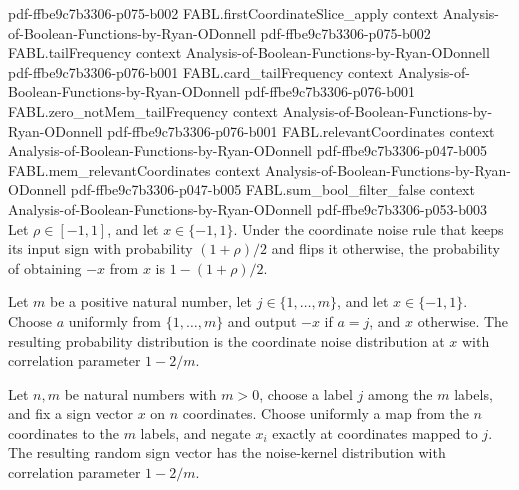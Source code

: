 \begin{theorem}
  {pdf-ffbe9c7b3306-p075-b002}
\proofstep
  {FABL.firstCoordinateSlice_apply}
  {context}
  {Analysis-of-Boolean-Functions-by-Ryan-ODonnell}
  {pdf-ffbe9c7b3306-p075-b002}
\proofstep
  {FABL.tailFrequency}
  {context}
  {Analysis-of-Boolean-Functions-by-Ryan-ODonnell}
  {pdf-ffbe9c7b3306-p076-b001}
\proofstep
  {FABL.card_tailFrequency}
  {context}
  {Analysis-of-Boolean-Functions-by-Ryan-ODonnell}
  {pdf-ffbe9c7b3306-p076-b001}
\proofstep
  {FABL.zero_notMem_tailFrequency}
  {context}
  {Analysis-of-Boolean-Functions-by-Ryan-ODonnell}
  {pdf-ffbe9c7b3306-p076-b001}
\proofstep
  {FABL.relevantCoordinates}
  {context}
  {Analysis-of-Boolean-Functions-by-Ryan-ODonnell}
  {pdf-ffbe9c7b3306-p047-b005}
\proofstep
  {FABL.mem_relevantCoordinates}
  {context}
  {Analysis-of-Boolean-Functions-by-Ryan-ODonnell}
  {pdf-ffbe9c7b3306-p047-b005}
\proofstep
  {FABL.sum_bool_filter_false}
  {context}
  {Analysis-of-Boolean-Functions-by-Ryan-ODonnell}
  {pdf-ffbe9c7b3306-p053-b003}
Let $\rho\in[-1,1]$, and let $x\in\{−1,1\}$. Under the coordinate noise rule that keeps
its input sign with probability $(1+\rho)/2$ and flips it otherwise, the probability of
obtaining $-x$ from $x$ is $1-(1+\rho)/2$.
\end{theorem}

\begin{theorem}
\label{FABL.map_uniformFin_fiberFlip_eq_coordinateNoisePMF}
\leanok
{}
Let $m$ be a positive natural number, let $j\in\{1,\ldots,m\}$, and let
$x\in\{-1,1\}$. Choose $a$ uniformly from $\{1,\ldots,m\}$ and output $-x$ if
$a=j$, and $x$ otherwise. The resulting probability distribution is the coordinate noise
distribution at $x$ with correlation parameter $1-2/m$.
\end{theorem}

\begin{theorem}
\label{FABL.map_uniformPartition_eq_noiseKernel}
\leanok
{}
Let $n,m$ be natural numbers with $m>0$, choose a label $j$ among the $m$ labels, and
fix a sign vector $x$ on $n$ coordinates. Choose uniformly a map from the $n$
coordinates to the $m$ labels, and negate $x_i$ exactly at coordinates mapped to $j$.
The resulting random sign vector has the noise-kernel distribution with correlation
parameter $1-2/m$.
\end{theorem}

